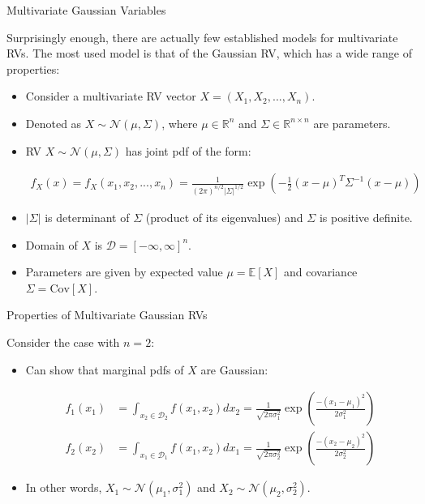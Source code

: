 \documentclass[9pt]{beamer}
\begin{document}
%
\begin{frame}{Multivariate Gaussian Variables}

Surprisingly enough, there are actually few established models for multivariate RVs.  The most used model is that of the Gaussian RV, which has a wide range of properties:

\begin{itemize}
\setlength{\itemsep}{10pt}
\item Consider a multivariate RV vector $X=(X_1,X_2,...,X_n)$.

\item Denoted as $X\sim \mathcal{N}(\mu,\Sigma)$, where $\mu\in \mathbb{R}^n$ and $\Sigma\in \mathbb{R}^{n\times n}$ are parameters. 

\item RV $X\sim \mathcal{N}(\mu,\Sigma)$ has joint pdf of the form:
\begin{block}{}
\begin{align*}
f_X(x)=f_X(x_1,x_2,...,x_n)=\frac{1}{(2\pi)^{n/2}|\Sigma|^{1/2}}\exp\left(-\frac{1}{2}(x-\mu)^T\Sigma^{-1}(x-\mu)\right)
\end{align*}
\end{block}
\item $|\Sigma|$ is determinant of  $\Sigma$ (product of its eigenvalues) and $\Sigma$ is positive definite. 

\item Domain of $X$ is $\mathcal{D}=[-\infty,\infty]^n$. 

\item Parameters are given by expected value $\mu=\mathbb{E}[X]$ and covariance $\Sigma=\textrm{Cov}[X]$.

\end{itemize}

\end{frame}

%
\begin{frame}{Properties of Multivariate Gaussian RVs}

Consider the case with $n=2$:
\begin{itemize}
\setlength{\itemsep}{10pt}
\item Can show that marginal pdfs of $X$ are Gaussian:
\begin{block}{}
\begin{align*}
f_1(x_1)&=\int_{x_2\in \mathcal{D}_2}f(x_1,x_2)dx_2=\frac{1}{\sqrt{2\pi\sigma_1^2}}\exp \left({\frac{-(x_1-\mu_1)^2}{2\sigma_1^2}}\right)\\
f_2(x_2)&=\int_{x_1\in \mathcal{D}_1}f(x_1,x_2)dx_1=\frac{1}{\sqrt{2\pi\sigma_2^2}}\exp \left({\frac{-(x_2-\mu_2)^2}{2\sigma_2^2}}\right)
\end{align*} 
\end{block}
\item In other words, $X_1\sim\mathcal{N}(\mu_1,\sigma_1^2)$ and $X_2\sim\mathcal{N}(\mu_2,\sigma_2^2)$.
\end{itemize}
\end{frame}
\end{document}

